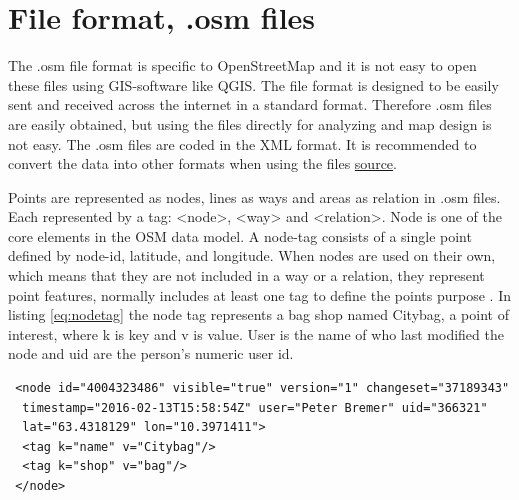 

 \section{File format, .osm files}
The .osm file format is specific to OpenStreetMap and it is not easy to open these files using GIS-software like QGIS. The file format is designed to be easily sent and received across the internet in a standard format. Therefore .osm files are easily obtained, but using the files directly for analyzing and map design is not easy. The .osm files are coded in the XML format. It is recommended to convert the data into other formats when using the files \href{http://learnosm.org/en/osm-data/file-formats/}{source}. 

Points are represented as nodes, lines as ways and areas as relation in .osm files. Each represented by a tag: <node>, <way> and <relation>. Node is one of the core elements in the OSM data model. A node-tag consists of a single point defined by node-id, latitude, and longitude. When nodes are used on their own, which means that they are not included in a way or a relation, they represent point features, normally includes at least one tag to define the points purpose \cite{OpenStreetMapc}. In listing \ref{eq:nodetag} the node tag represents a bag shop named Citybag, a point of interest, where k is key and v is value. User is the name of who last modified the node and uid are the person's numeric user id.  

\begin{lstlisting}
 <node id="4004323486" visible="true" version="1" changeset="37189343"
  timestamp="2016-02-13T15:58:54Z" user="Peter Bremer" uid="366321" 
  lat="63.4318129" lon="10.3971411">
  <tag k="name" v="Citybag"/>
  <tag k="shop" v="bag"/>
 </node>
\end{lstlisting}

